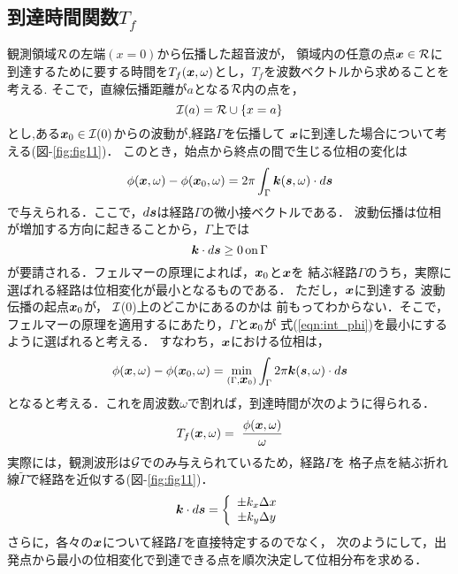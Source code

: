 \subsection{到達時間関数$T_f$}
観測領域${\cal R}$の左端$(x=0)$から伝播した超音波が，
領域内の任意の点$\fat{x}\in {\cal R}$に
到達するために要する時間を$T_f(\mbox{\boldmath{$x$}},\omega)$とし，$T_f$を波数ベクトルから求めることを考える.
そこで，直線伝播距離が$a$となる$\cal R$内の点を，
\begin{equation}
	{\cal I}(a)={\cal R} \cup \left\{ x=a\right\}
	\label{eqn:def_I0}
\end{equation}
とし,ある$\fat{x}_0\in {\cal I}(0)$からの波動が,経路$\Gamma$を伝播して
$\mbox{\boldmath{$x$}}$に到達した場合について考える(図-\ref{fig:fig11})．
このとき，始点から終点の間で生じる位相の変化は
\begin{equation}
	\phi(\fat{x},\omega)-\phi(\fat{x}_0,\omega)=
	2\pi \int_{\Gamma} \fat{k}(\fat{s},\omega)\cdot d\fat{s}
	\label{eqn:int_phi}
\end{equation}
で与えられる．ここで，$d\mbox{\boldmath{$s$}}$は経路$\Gamma$の微小接ベクトルである．
波動伝播は位相が増加する方向に起きることから，$\Gamma$上では
\begin{equation}
	\fat{k}\cdot d\fat{s}\geq 0 \, {\rm on} \, \Gamma 
	\label{eqn:}
\end{equation}
が要請される．フェルマーの原理によれば，$\mbox{\boldmath{$x$}}_0$と$\mbox{\boldmath{$x$}}$を
結ぶ経路$\Gamma$のうち，実際に選ばれる経路は位相変化が最小となるものである．
ただし，$\mbox{\boldmath{$x$}}$に到達する 波動伝播の起点$\mbox{\boldmath{$x$}}_0$が， $\cal I$(0)上のどこかにあるのかは
前もってわからない．そこで，フェルマーの原理を適用するにあたり，$\Gamma$と$\mbox{\boldmath{$x$}}_0$が
式(\ref{eqn:int_phi})を最小にするように選ばれると考える．
すなわち，$\mbox{\boldmath{$x$}}$における位相は，
\begin{equation}
	\phi(\fat{x},\omega) - \phi(\fat{x}_0,\omega)
	=
	\min_{\left(\Gamma, \fat{x}_0\right)}
	\int_\Gamma 2\pi \fat{k}(\fat{s},\omega) \cdot d\fat{s}
	\label{eqn:Fermat}
\end{equation}
となると考える．これを周波数$\omega$で割れば，到達時間が次のように得られる．
\begin{equation}
	T_f(\fat{x},\omega) = \
	\frac{\phi(\fat{x},\omega)}{\omega}
	\label{eqn:def_Tf}
\end{equation}
実際には，観測波形は${\cal G}$でのみ与えられているため，経路$\Gamma$を
格子点を結ぶ折れ線$\tilde \Gamma$で経路を近似する(図-\ref{fig:fig11})．
\begin{equation}
	\fat{k}\cdot d\fat{s}
	=
	\left\{
	\begin{array}{c}
		\pm k_x \Delta x \\
		\pm k_y \Delta y
	\end{array}
	\right.
	\label{eqn:}
\end{equation}
さらに，各々の$\mbox{\boldmath{$x$}}$について経路$\Gamma$を直接特定するのでなく，
次のようにして，出発点から最小の位相変化で到達できる点を順次決定して位相分布を求める．
